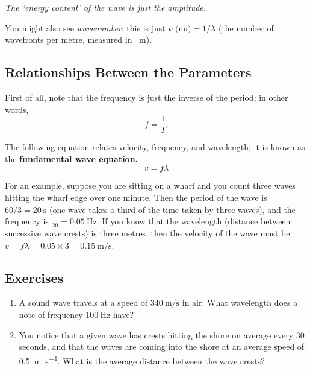 \documentclass[a4paper]{amsbook}
\begin{document}
\textit{The `energy content' of the wave is just the amplitude.}

You might also see \textit{wavenumber}: this is just $ \nu\text{ (nu)} = 1/\lambda $ (the number of wavefronts per metre, measured in \si{\per\metre}).

\subsection{Relationships Between the Parameters}
First of all, note that the frequency is just the inverse of the period; in other words,
\begin{equation}
  f = \frac{1}{T}.
\end{equation}

The following equation relates velocity, frequency, and wavelength; it is known as the \textbf{fundamental wave equation.}
\begin{equation}
  v = f \lambda
\end{equation}

For an example, suppose you are sitting on a wharf and you count three waves hitting the wharf edge over one minute. Then
the period of the wave is $ 60/3 = \SI{20}{\second} $ (one wave takes a third of the time taken by three waves), and the
frequency is $ \frac{1}{20} = \SI{0.05}{\hertz} $. If you know that the wavelength (distance between successive wave crests)
is three metres, then the velocity of the wave must be $ v = f\lambda = 0.05 \times 3 = \SI{0.15}{\metre\per\second} $.

\subsection{Exercises}
\begin{enumerate}
  \item A sound wave travels at a speed of $ \SI{340}{\metre\per\second} $ in air. What wavelength does
        a note of frequency $ \SI{100}{\hertz} $ have?
  \item You notice that a given wave has crests hitting the shore on average every 30 seconds, and that the waves are coming into
        the shore at an average speed of \SI{0.5}{\metre\per\second}. What is the average distance between the wave crests?
\end{enumerate}
\end{document}
